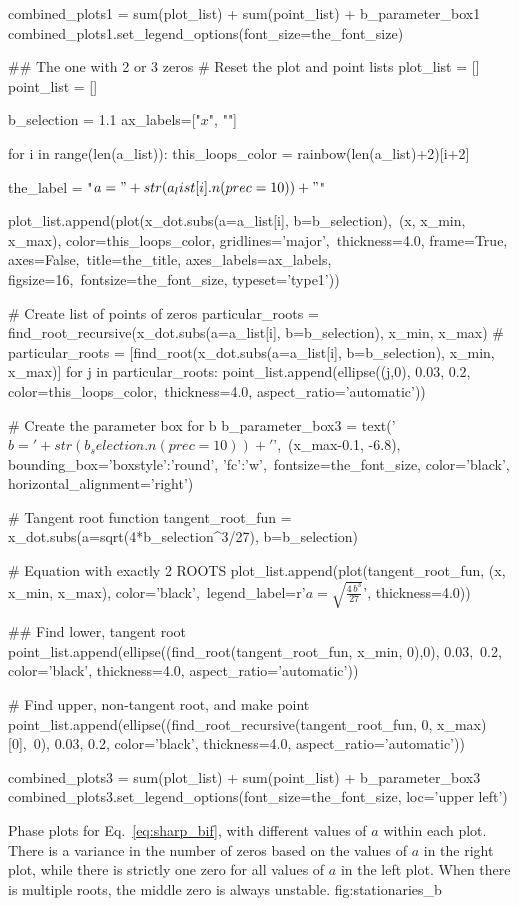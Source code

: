 \begin{sagesilent}
	combined_plots1 = sum(plot_list) + sum(point_list) + b_parameter_box1
	combined_plots1.set_legend_options(font_size=the_font_size)


	## The one with 2 or 3 zeros
	# Reset the plot and point lists
	plot_list = []
	point_list = []

	b_selection = 1.1
	ax_labels=["$x$", ""]

	for i in range(len(a_list)):
	    this_loops_color = rainbow(len(a_list)+2)[i+2]

	    the_label = "$a = " + str(a_list[i].n(prec=10)) + "$"

	    plot_list.append(plot(x_dot.subs(a=a_list[i], b=b_selection),\
	    		(x, x_min, x_max), color=this_loops_color, gridlines='major',\
	    		thickness=4.0, frame=True, axes=False,\
	    		title=the_title, axes_labels=ax_labels, figsize=16,\
	    		fontsize=the_font_size, typeset='type1'))

	    # Create list of points of zeros
	    particular_roots = find_root_recursive(x_dot.subs(a=a_list[i], b=b_selection), x_min, x_max)
	#	particular_roots = [find_root(x_dot.subs(a=a_list[i], b=b_selection), x_min, x_max)]
	    for j in particular_roots:
	    	point_list.append(ellipse((j,0), 0.03, 0.2, color=this_loops_color,\
	    			thickness=4.0, aspect_ratio='automatic'))


	# Create the parameter box for b
	b_parameter_box3 = text('$b = ' + str(b_selection.n(prec=10)) + '$',\
			(x_max-0.1, -6.8), bounding_box={'boxstyle':'round', 'fc':'w'},\
			fontsize=the_font_size, color='black', horizontal_alignment='right')


	# Tangent root function
	tangent_root_fun = x_dot.subs(a=sqrt(4*b_selection^3/27), b=b_selection)

	# Equation with exactly 2 ROOTS
	plot_list.append(plot(tangent_root_fun, (x, x_min, x_max), color='black',\
			legend_label=r'$a = \sqrt{\frac{4\,b^3}{27}}$', thickness=4.0))

	## Find lower, tangent root
	point_list.append(ellipse((find_root(tangent_root_fun, x_min, 0),0), 0.03,\
			0.2, color='black', thickness=4.0, aspect_ratio='automatic'))

	# Find upper, non-tangent root, and make point
	point_list.append(ellipse((find_root_recursive(tangent_root_fun, 0, x_max)[0],\
			0), 0.03, 0.2, color='black', thickness=4.0, aspect_ratio='automatic'))

	combined_plots3 = sum(plot_list) + sum(point_list) + b_parameter_box3
	combined_plots3.set_legend_options(font_size=the_font_size, loc='upper left')

\end{sagesilent}
\TwoFigOneCap{\sageplot[width=1.1\textwidth]{combined_plots1}}
	{}
	{Phase plots for Eq.~\ref{eq:sharp_bif}, with different values of $a$ within each plot. %
	There is a variance in the number of zeros based on the values of $a$ in the right plot, while there is strictly one zero for all values of $a$ in the left plot. %
	When there is multiple roots, the middle zero is always unstable.}
	{fig:stationaries_b}

